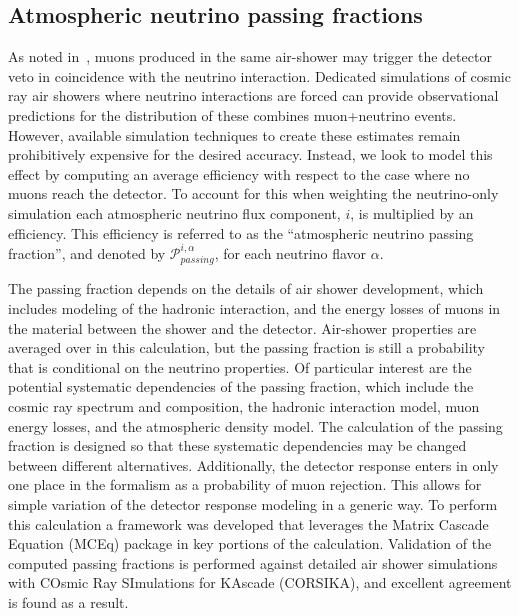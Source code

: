\subsection{Atmospheric neutrino passing fractions}

As noted in~\cite{Schonert:2008is}, muons produced in the same air-shower may trigger the detector veto in coincidence with the neutrino interaction.
Dedicated simulations of cosmic ray air showers where neutrino interactions are forced can provide observational predictions for the distribution of these combines muon+neutrino events.
However, available simulation techniques to create these estimates remain prohibitively expensive for the desired accuracy.
Instead, we look to model this effect by computing an average efficiency with respect to the case where no muons reach the detector.
To account for this when weighting the neutrino-only simulation each atmospheric neutrino flux component, $i$, is multiplied by an efficiency.
This efficiency is referred to as the ``atmospheric neutrino passing fraction'', and denoted by $\mathcal{P}^{i,\alpha}_{passing}$, for each neutrino flavor $\alpha$.

The passing fraction depends on the details of air shower development, which includes modeling of the hadronic interaction, and the energy losses of muons in the material between the shower and the detector. 
Air-shower properties are averaged over in this calculation, but the passing fraction is still a probability that is conditional on the neutrino properties.
Of particular interest are the potential systematic dependencies of the passing fraction, which include the cosmic ray spectrum and composition, the hadronic interaction model, muon energy losses, and the atmospheric density model.
The calculation of the passing fraction is designed so that these systematic dependencies may be changed between different alternatives.
Additionally, the detector response enters in only one place in the formalism as a probability of muon rejection.
This allows for simple variation of the detector response modeling in a generic way.
To perform this calculation a framework was developed that leverages the Matrix Cascade Equation (MCEq) package in key portions of the calculation.
Validation of the computed passing fractions is performed against detailed air shower simulations with COsmic Ray SImulations for KAscade (CORSIKA), and excellent agreement is found as a result.

